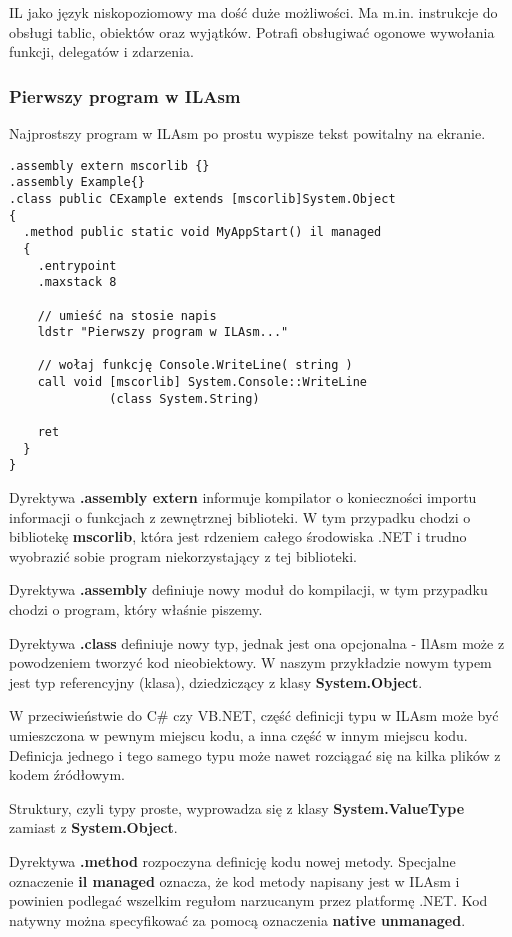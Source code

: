 IL jako język niskopoziomowy ma dość duże możliwości. 
Ma m.in. instrukcje do obsługi tablic, obiektów oraz wyjątków.
Potrafi obsługiwać ogonowe wywołania funkcji, delegatów i zdarzenia.

\subsubsection{Pierwszy program w ILAsm}

Najprostszy program w ILAsm po prostu wypisze tekst powitalny na ekranie.

\begin{scriptsize}
\begin{verbatim}
.assembly extern mscorlib {}
.assembly Example{} 
.class public CExample extends [mscorlib]System.Object
{ 
  .method public static void MyAppStart() il managed 
  { 
    .entrypoint 
    .maxstack 8

    // umieść na stosie napis
    ldstr "Pierwszy program w ILAsm..." 

    // wołaj funkcję Console.WriteLine( string )
    call void [mscorlib] System.Console::WriteLine
              (class System.String)

    ret 
  } 
}
\end{verbatim}
\end{scriptsize}

Dyrektywa {\bf .assembly extern} informuje kompilator o konieczności importu informacji o funkcjach
z zewnętrznej biblioteki. W tym przypadku chodzi o bibliotekę {\bf mscorlib}, która jest
rdzeniem całego środowiska .NET i trudno wyobrazić sobie program niekorzystający z tej biblioteki.

Dyrektywa {\bf .assembly} definiuje nowy moduł do kompilacji, w tym przypadku chodzi o 
program, który właśnie piszemy.

Dyrektywa {\bf .class} definiuje nowy
typ, jednak jest ona opcjonalna - IlAsm może z powodzeniem tworzyć kod nieobiektowy. W naszym
przykładzie nowym typem jest typ referencyjny (klasa), dziedziczący z klasy {\bf System.Object}. 

W przeciwieństwie do C\# czy VB.NET, część definicji typu w ILAsm może być umieszczona w pewnym
miejscu kodu, a inna część w innym miejscu kodu. Definicja jednego i tego samego typu może
nawet rozciągać się na kilka plików z kodem źródłowym.

Struktury, czyli typy proste, wyprowadza się z klasy {\bf System.ValueType} zamiast z {\bf System.Object}.

Dyrektywa {\bf .method} rozpoczyna definicję kodu nowej metody. Specjalne oznaczenie {\bf il managed} oznacza, że
kod metody napisany jest w ILAsm i powinien podlegać wszelkim regułom narzucanym przez platformę .NET. 
Kod natywny można specyfikować za pomocą oznaczenia {\bf native unmanaged}.

